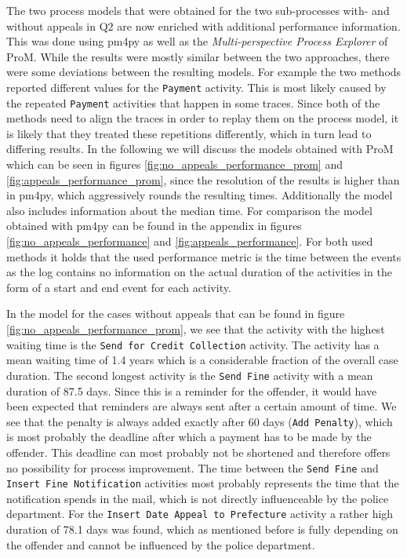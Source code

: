\documentclass[12pt]{report}
\begin{document}
The two process models that were obtained for the two sub-processes with- and without appeals in Q2 are now enriched with additional performance information. This was done using pm4py as well as the \emph{Multi-perspective Process Explorer} of ProM. While the results were mostly similar between the two approaches, there were some deviations between the resulting models. For example the two methods reported different values for the \texttt{Payment} activity. This is most likely caused by the repeated \texttt{Payment} activities that happen in some traces. Since both of the methods need to align the traces in order to replay them on the process model, it is likely that they treated these repetitions differently, which in turn lead to differing results. In the following we will discuss the models obtained with ProM which can be seen in figures \ref{fig:no_appeals_performance_prom} and \ref{fig:appeals_performance_prom}, since the resolution of the results is higher than in pm4py, which aggressively rounds the resulting times. Additionally the model also includes information about the median time. For comparison the model obtained with pm4py can be found in the appendix in figures \ref{fig:no_appeals_performance} and \ref{fig:appeals_performance}. For both used methods it holds that the used performance metric is the time between the events as the log contains no information on the actual duration of the activities in the form of a start and end event for each activity.

In the model for the cases without appeals that can be found in figure \ref{fig:no_appeals_performance_prom}, we see that the activity with the highest waiting time is the \texttt{Send for Credit Collection} activity. The activity has a mean waiting time of 1.4 years which is a considerable fraction of the overall case duration. The second longest activity is the \texttt{Send Fine} activity with a mean duration of 87.5 days. Since this is a reminder for the offender, it would have been expected that reminders are always sent after a certain amount of time. We see that the penalty is always added exactly after 60 days (\texttt{Add Penalty}), which is most probably the deadline after which a payment has to be made by the offender. This deadline can most probably not be shortened and therefore offers no possibility for process improvement. The time between the \texttt{Send Fine} and \texttt{Insert Fine Notification} activities most probably represents the time that the notification spends in the mail, which is not directly influenceable by the police department. For the \texttt{Insert Date Appeal to Prefecture} activity a rather high duration of 78.1 days was found, which as mentioned before is fully depending on the offender and cannot be influenced by the police department.
\end{document}

